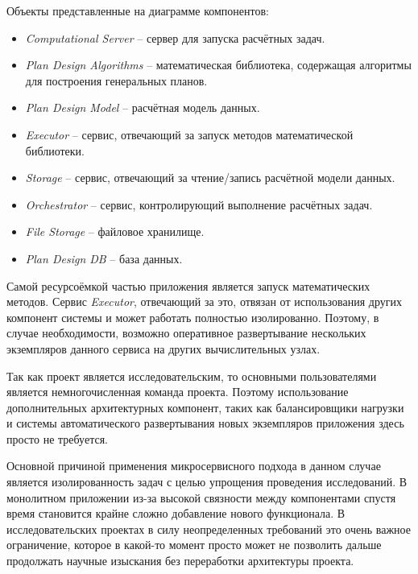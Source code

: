 \noindent Объекты представленные на диаграмме компонентов:
\begin{itemize}
	\item \textit{Computational Server} -- сервер для запуска расчётных задач.
	\item \textit{Plan Design Algorithms} -- математическая библиотека, содержащая алгоритмы
	для построения генеральных планов.
	\item \textit{Plan Design Model} -- расчётная модель данных.
	\item \textit{Executor} -- сервис, отвечающий за запуск методов математической библиотеки.
	\item \textit{Storage} -- сервис, отвечающий за чтение/запись расчётной модели данных.
	\item \textit{Orchestrator} -- сервис, контролирующий выполнение расчётных задач.
	\item \textit{File Storage} -- файловое хранилище.
	\item \textit{Plan Design DB} -- база данных.
\end{itemize}

Самой ресурсоёмкой частью приложения является запуск математических методов.
Сервис \textit{Executor}, отвечающий за это, отвязан от использования других компонент системы
и может работать полностью изолированно.
Поэтому, в случае необходимости, возможно оперативное развертывание нескольких экземпляров данного сервиса
на других вычислительных узлах.

Так как проект является исследовательским, то основными пользователями является немногочисленная команда проекта.
Поэтому использование дополнительных архитектурных компонент,
таких как балансировщики нагрузки и системы автоматического развертывания новых экземпляров приложения
здесь просто не требуется.

Основной причиной применения микросервисного подхода в данном случае является изолированность задач с целью
упрощения проведения исследований.
В монолитном приложении из-за высокой связности между компонентами спустя время становится крайне сложно добавление
нового функционала. В исследовательских проектах в силу неопределенных требований это очень важное ограничение,
которое в какой-то момент просто может не позволить дальше продолжать
научные изыскания без переработки архитектуры проекта.
